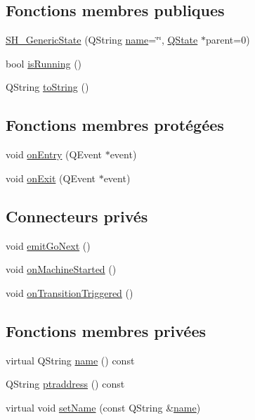 \subsection*{Fonctions membres publiques}
\begin{DoxyCompactItemize}
\item 
\hyperlink{classSH__GenericState_a3cc3cb1491b812dfdd032fc6438dfd4e}{S\-H\-\_\-\-Generic\-State} (Q\-String \hyperlink{classSH__NamedObject_a9f686c6f2a5bcc08ad03d0cee0151f0f}{name}=\char`\"{}\char`\"{}, \hyperlink{classQState}{Q\-State} $\ast$parent=0)
\item 
bool \hyperlink{classSH__GenericState_a5f731810dad0cacd28828ccbf1539e4e}{is\-Running} ()
\item 
Q\-String \hyperlink{classSH__GenericState_a7779babbb40f3f8faa71112204d9804f}{to\-String} ()
\end{DoxyCompactItemize}
\subsection*{Fonctions membres protégées}
\begin{DoxyCompactItemize}
\item 
void \hyperlink{classSH__GenericState_a68c67ef95738e01cd34cd5926f4932fb}{on\-Entry} (Q\-Event $\ast$event)
\item 
void \hyperlink{classSH__GenericState_a7f7863859318c70c9b734be5bf5510b0}{on\-Exit} (Q\-Event $\ast$event)
\end{DoxyCompactItemize}
\subsection*{Connecteurs privés}
\begin{DoxyCompactItemize}
\item 
void \hyperlink{classSH__GenericState_a66d4d4d94ef4fac3eb8d137848290582}{emit\-Go\-Next} ()
\item 
void \hyperlink{classSH__GenericState_a4bf70be0a8f92cd7d6dacd953df90f52}{on\-Machine\-Started} ()
\item 
void \hyperlink{classSH__GenericState_aad4259cc1e6a51681d6a92e995486380}{on\-Transition\-Triggered} ()
\end{DoxyCompactItemize}
\subsection*{Fonctions membres privées}
\begin{DoxyCompactItemize}
\item 
virtual Q\-String \hyperlink{classSH__NamedObject_a9f686c6f2a5bcc08ad03d0cee0151f0f}{name} () const 
\item 
Q\-String \hyperlink{classSH__NamedObject_a147d0e52d9f0fc1d3a423d02f82325f5}{ptraddress} () const 
\item 
virtual void \hyperlink{classSH__NamedObject_a6bc164e6fa10ae190770529af75d1775}{set\-Name} (const Q\-String \&\hyperlink{classSH__NamedObject_a9f686c6f2a5bcc08ad03d0cee0151f0f}{name})
\end{DoxyCompactItemize}

